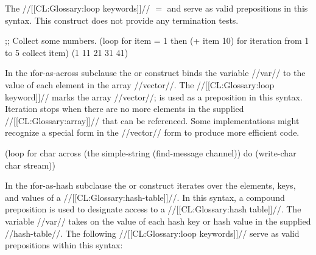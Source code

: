 The //[[CL:Glossary:loop keywords]]// {$=$} and  serve as valid prepositions
in this syntax. 
This construct does not provide any termination tests.
 















\code
;; Collect some numbers.
 (loop for item = 1 then (+ item 10)
       for iteration from 1 to 5
       collect item)
\EV (1 11 21 31 41)
\endcode
 
\endsubsubsubsubsection%

\endsubsubsubsection%


  In the \i{for-as-across} subclause the  
  or  construct binds the variable //var// to the value of
  each element in the array //vector//.
  The //[[CL:Glossary:loop keyword]]//  marks the array //vector//; 
  is used as a preposition in this syntax.
  Iteration stops when there are no more elements in the supplied
  //[[CL:Glossary:array]]// that can be referenced.
  Some implementations might recognize a  special form
  in the //vector// form to produce more efficient code.
 

\code
 (loop for char across (the simple-string (find-message channel))
       do (write-char char stream))
\endcode
 
\endsubsubsubsubsection%

\endsubsubsubsection%


  In the \i{for-as-hash} subclause
  the  
  or  construct 
  iterates over the elements, keys, and values of a //[[CL:Glossary:hash-table]]//.
  In this syntax, a compound preposition is used to designate access to a
  //[[CL:Glossary:hash table]]//.
  The variable //var// takes on the value of each hash key
  or hash value in the supplied //hash-table//. 
  The following //[[CL:Glossary:loop keywords]]// serve as valid prepositions within this syntax:
 
